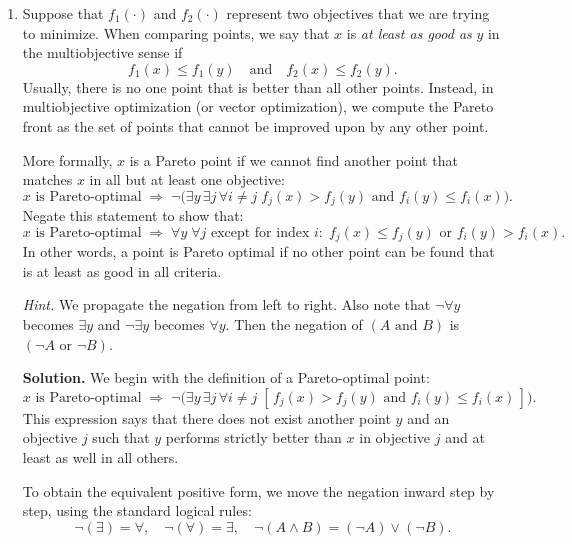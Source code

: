 \documentclass[11pt]{article}
\begin{document}
	\begin{enumerate}[label=\textbf{(\alph*)}, leftmargin=1.2cm]
		\item Suppose that $f_1(\cdot)$ and $f_2(\cdot)$ represent two objectives that we are trying to minimize. When comparing points, we say that $x$ is \emph{at least as good as} $y$ in the multiobjective sense if
		\[
		f_1(x) \le f_1(y) \quad \text{and} \quad f_2(x) \le f_2(y).
		\]
		Usually, there is no one point that is better than all other points. Instead, in multiobjective optimization (or vector optimization), we compute the Pareto front as the set of points that cannot be improved upon by any other point.
		
		More formally, $x$ is a Pareto point if we cannot find another point that matches $x$ in all but at least one objective:
		\[
		x \text{ is Pareto-optimal} \;\Rightarrow\; \neg \bigl(\exists y \, \exists j \, \forall i \ne j \; f_j(x) > f_j(y) \text{ and } f_i(y) \le f_i(x) \bigr).
		\]
		Negate this statement to show that:
		\[
		x \text{ is Pareto-optimal} \;\Rightarrow\; \forall y \; \forall j \text{ except for index } i: \; f_j(x) \le f_j(y) \text{ or } f_i(y) > f_i(x).
		\]
		In other words, a point is Pareto optimal if no other point can be found that is at least as good in all criteria.
		
		\noindent\textit{Hint.} We propagate the negation from left to right. Also note that $\neg \forall y$ becomes $\exists y$ and $\neg \exists y$ becomes $\forall y$. Then the negation of $(A \text{ and } B)$ is $(\neg A \text{ or } \neg B)$.
		
		\noindent\textbf{Solution.}
		We begin with the definition of a Pareto-optimal point:
		\[
		x \text{ is Pareto-optimal} \;\Rightarrow\;
		\neg \bigl( \exists y \, \exists j \, \forall i \ne j \;
		[\, f_j(x) > f_j(y) \text{ and } f_i(y) \le f_i(x) \,] \bigr).
		\]
		This expression says that there does not exist another point $y$ and an objective $j$
		such that $y$ performs strictly better than $x$ in objective $j$ and at least as well in all others.
		
		To obtain the equivalent positive form, we move the negation inward step by step,
		using the standard logical rules:
		\[
		\neg(\exists) = \forall, \quad
		\neg(\forall) = \exists, \quad
		\neg(A \land B) = (\neg A) \lor (\neg B).
		\]
		

\end{enumerate}
\end{document}
